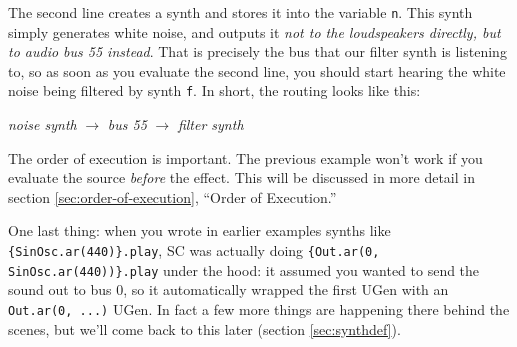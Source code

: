 The second line creates a synth and stores it into the variable \texttt{n}. This synth simply generates white noise, and outputs it \emph{not to the loudspeakers directly, but to audio bus 55 instead}. That is precisely the bus that our filter synth is listening to, so as soon as you evaluate the second line, you should start hearing the white noise being filtered by synth \texttt{f}.
In short, the routing looks like this:

\begin{center}
\emph{noise synth} $\rightarrow$ \emph{bus 55} $\rightarrow$ \emph{filter synth}
\end{center}

The order of execution is important. The previous example won't work if you evaluate the source \emph{before} the effect. This will be discussed in more detail in section \ref{sec:order-of-execution}, ``Order of Execution.''

One last thing: when you wrote in earlier examples synths like \texttt{\{SinOsc.ar(440)\}.play}, SC was actually doing \texttt{\{Out.ar(0, SinOsc.ar(440))\}.play} under the hood: it assumed you wanted to send the sound out to bus 0, so it automatically wrapped the first UGen with an \texttt{Out.ar(0, ...)} UGen. In fact a few more things are happening there behind the scenes, but we'll come back to this later (section \ref{sec:synthdef}).

